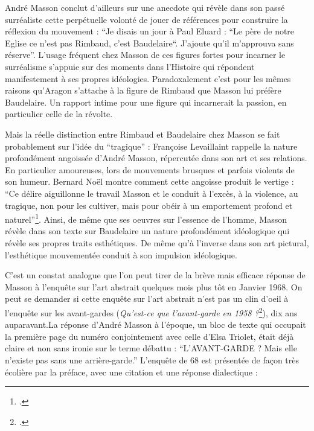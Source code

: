 	 André Masson conclut d’ailleurs sur une anecdote qui révèle dans son passé surréaliste cette perpétuelle volonté de jouer de références pour construire la réflexion du mouvement : \enquote{Je disais un jour à Paul Eluard : “Le père de notre Eglise ce n’est pas Rimbaud, c’est Baudelaire“. J’ajoute qu’il m’approuva sans réserve}. L'usage fréquent chez Masson de ces figures fortes pour incarner le surréalisme s’appuie sur des moments dans l’Histoire qui répondent manifestement à ses propres idéologies. Paradoxalement c’est pour les mêmes raisons qu’Aragon s’attache à la figure de Rimbaud que Masson lui préfère Baudelaire. Un rapport intime pour une figure qui incarnerait la passion, en particulier celle de la révolte. 

	Mais la réelle distinction entre Rimbaud et Baudelaire chez Masson se fait probablement sur l’idée du \enquote{tragique} : Françoise Levaillaint rappelle la nature profondément angoissée d’André Masson, répercutée dans son art et ses relations. En particulier amoureuses, lors de mouvements brusques et parfois violents de son humeur. Bernard Noël montre comment cette angoisse produit le vertige : \enquote{Ce délire aiguillonne le travail Masson et le conduit à l’excès, à la violence, au tragique, non pour les cultiver, mais pour obéir à un emportement profond et naturel}\footcite[p83]{noel}.  Ainsi, de même que ses oeuvres sur l’essence de l’homme, Masson révèle dans son texte sur Baudelaire un nature profondément idéologique qui révèle ses propres traits esthétiques. De même qu’à l’inverse dans son art pictural, l’esthétique mouvementée conduit à son impulsion idéologique. 

C’est un constat analogue que l’on peut tirer de la brève mais efficace réponse de Masson à l’enquête sur l’art abstrait quelques mois plus tôt en Janvier 1968. On peut se demander si cette enquête sur l’art abstrait n’est pas un clin d’oeil à l’enquête sur les avant-gardes (\emph{Qu’est-ce que l’avant-garde en 1958 ?}\footcite{avantgarde}), dix ans auparavant.La réponse d’André Masson à l’époque, un bloc de texte qui occupait la première page du numéro conjointement avec celle d’Elsa Triolet, était déjà claire et non sans ironie sur le terme débattu : \enquote{L’AVANT-GARDE ? Mais elle n’existe pas sans une arrière-garde.} L’enquête de 68 est présentée de façon très écolière par la préface, avec une citation et une réponse dialectique : 

